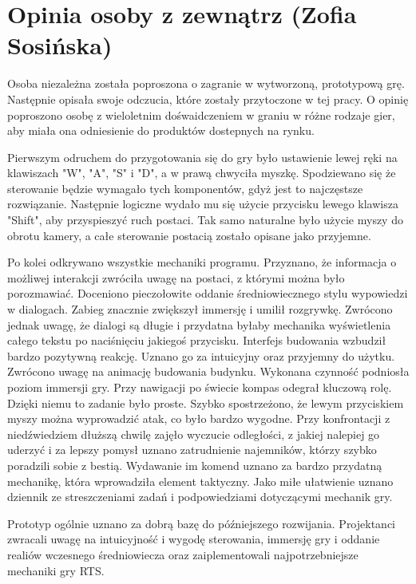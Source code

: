 \section{Opinia osoby z zewnątrz (Zofia Sosińska)}
Osoba niezależna została poproszona o zagranie w wytworzoną, prototypową grę. Następnie opisała swoje odczucia, które zostały przytoczone 
w tej pracy. O opinię poproszono osobę z wieloletnim dośwaidczeniem w graniu w różne rodzaje gier, aby miała ona odniesienie do produktów
dostepnych na rynku.

Pierwszym odruchem do przygotowania się do gry było ustawienie lewej ręki na klawiszach "W", "A", "S" i "D", a w prawą chwyciła myszkę. Spodziewano się 
że sterowanie będzie wymagało tych komponentów, gdyż jest to najczęstsze rozwiązanie. Następnie logiczne wydało mu się użycie przycisku lewego klawisza "Shift", aby przyspieszyć ruch postaci. 
Tak samo naturalne było użycie myszy do obrotu kamery, a całe sterowanie postacią zostało opisane jako przyjemne.

Po kolei odkrywano wszystkie mechaniki programu. Przyznano, że informacja o możliwej interakcji zwróciła uwagę na postaci, z którymi można było porozmawiać. 
Doceniono pieczołowite oddanie średniowiecznego stylu wypowiedzi w dialogach. Zabieg znacznie zwiększył immersję i umilił rozgrywkę. Zwrócono jednak uwagę,
że dialogi są długie i przydatna byłaby mechanika wyświetlenia całego tekstu po naciśnięciu jakiegoś przycisku. Interfejs budowania wzbudził bardzo pozytywną reakcję.
Uznano go za intuicyjny oraz przyjemny do użytku. Zwrócono uwagę na animację budowania budynku. Wykonana czynność podniosła poziom immersji gry. Przy nawigacji po świecie
kompas odegrał kluczową rolę. Dzięki niemu to zadanie było proste. Szybko spostrzeżono, że lewym przyciskiem myszy można wyprowadzić atak, co było bardzo wygodne. 
Przy konfrontacji z niedźwiedziem dłuższą chwilę zajęło wyczucie odległości, z jakiej nalepiej go uderzyć i za lepszy pomysł uznano zatrudnienie najemników, którzy szybko poradzili
sobie z bestią. Wydawanie im komend uznano za bardzo przydatną mechanikę, która wprowadziła element taktyczny. Jako miłe ułatwienie uznano dziennik ze streszczeniami zadań i 
podpowiedziami dotyczącymi mechanik gry.

Prototyp ogólnie uznano za dobrą bazę do późniejszego rozwijania. Projektanci zwracali uwagę na intuicyjność i wygodę sterowania, immersję gry i oddanie realiów wczesnego średniowiecza
oraz zaiplementowali najpotrzebniejsze mechaniki gry RTS. 